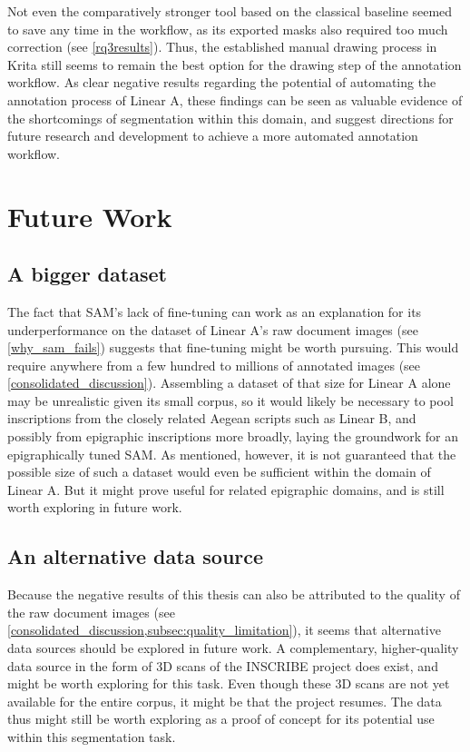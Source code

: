 Not even the comparatively stronger tool based on the classical baseline seemed to save any time in the workflow, as its exported masks also required too much correction (see \cref{rq3results}).
Thus, the established manual drawing process in Krita still seems to remain the best option for the drawing step of the annotation workflow.
As clear negative results regarding the potential of automating the annotation process of Linear A, these findings can be seen as valuable evidence of the shortcomings of segmentation within this domain, and suggest directions for future research and development to achieve a more automated annotation workflow.

\section{Future Work}
\subsection{A bigger dataset}
The fact that \acs{SAM}'s lack of fine-tuning can work as an explanation for its underperformance on the dataset of Linear A's raw document images (see \cref{why_sam_fails}) suggests that fine-tuning might be worth pursuing.
This would require anywhere from a few hundred to millions of annotated images (see \cref{consolidated_discussion}).
Assembling a dataset of that size for Linear A alone may be unrealistic given its small corpus, so it would likely be necessary to pool inscriptions from the closely related Aegean scripts such as Linear B, and possibly from epigraphic inscriptions more broadly, laying the groundwork for an epigraphically tuned \acs{SAM}.
As mentioned, however, it is not guaranteed that the possible size of such a dataset would even be sufficient within the domain of Linear A.
But it might prove useful for related epigraphic domains, and is still worth exploring in future work.

\subsection{An alternative data source}
Because the negative results of this thesis can also be attributed to the quality of the raw document images (see \cref{consolidated_discussion,subsec:quality_limitation}), it seems that alternative data sources should be explored in future work.
A complementary, higher-quality data source in the form of 3D scans of the INSCRIBE project \parencite{INSCRIBE3D} does exist, and might be worth exploring for this task.
Even though these 3D scans are not yet available for the entire corpus, it might be that the project resumes.
The data thus might still be worth exploring as a proof of concept for its potential use within this segmentation task.

